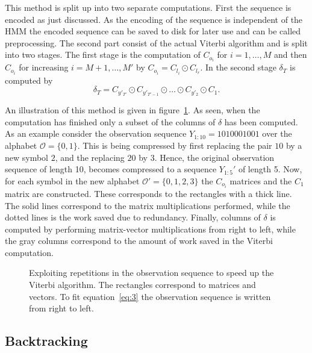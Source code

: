 This method is split up into two separate computations. First the sequence
is encoded as just discussed. As the encoding of the sequence is independent of
the HMM the encoded sequence can be saved to disk for later use and can be
called preprocessing. The second part consist of the actual Viterbi algorithm
and is split into two stages. The first stage is the computation of
$C_{o_i}$ for $i = 1, \dots, M$ and then $C_{o_i}$ for increasing
$i = M + 1, \dots, M'$ by $C_{o_i} = C_{l_i} \odot C_{l_r}$. In the second
stage $\delta_T$ is computed by
\begin{equation}
  \label{eq:3}
  \delta_T = C_{y'_{T'}} \odot C_{y'_{T'-1}} \odot \dots \odot C_{y'_2} \odot C_1.
\end{equation}

An illustration of this method is given in
figure~\ref{fig:exploiting-repetitions}. As seen, when the computation has
finished only a subset of the columns of $\delta$ has been computed. As an
example consider the observation sequence $Y_{1:10} = 1010001001$ over the
alphabet $\mathcal{O} = \{0, 1\}$. This is being compressed by first replacing
the pair $10$ by a new symbol $2$, and the replacing $20$ by $3$. Hence, the
original observation sequence of length 10, becomes compressed to a sequence
$Y_{1:5}'$ of length 5. Now, for each symbol in the new alphabet
$\mathcal{O'} = \{0, 1, 2, 3\}$ the $C_{o_i}$ matrices and the $C_1$ matrix are
constructed. These corresponds to the rectangles with a thick line. The solid
lines correspond to the matrix multiplications performed, while the dotted
lines is the work saved due to redundancy. Finally, columns of $\delta$ is
computed by performing matrix-vector multiplications from right to left, while
the gray columns correspond to the amount of work saved in the Viterbi
computation.

\begin{figure}
  \centering
  
  \caption{Exploiting repetitions in the observation sequence to speed up the
    Viterbi algorithm. The rectangles correspond to matrices and vectors. To
    fit equation~\eqref{eq:3} the observation sequence is written from right to
    left.}
  \label{fig:exploiting-repetitions}
\end{figure}

\subsection{Backtracking}
\label{sec:backtracking}

